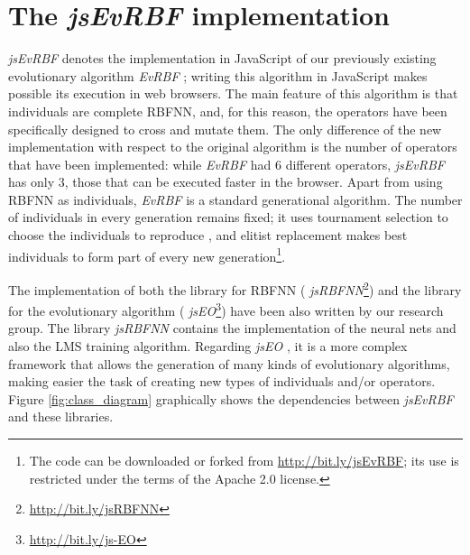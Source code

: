 \documentclass{article}
\begin{document}
\section{The {\em jsEvRBF} implementation} %
\label{sec:algorithm}
{\em jsEvRBF} denotes the implementation in JavaScript of our previously existing evolutionary algorithm {\em EvRBF} \cite{rivas03:EvRBF}; writing this algorithm in JavaScript makes possible its execution in web browsers.
The main feature of this algorithm is that individuals are complete RBFNN, and, for this reason,
the operators have been specifically designed to cross and mutate them. The only difference of the new implementation with respect to the original algorithm is the number of operators that have been implemented: while {\em EvRBF} had 6 different operators, {\em jsEvRBF} has only 3, those that can be executed faster in the browser. %
Apart from using RBFNN as individuals, {\em EvRBF} is a standard generational algorithm. The number of individuals in every generation remains fixed; it uses tournament selection to choose the individuals to reproduce , and elitist replacement  makes best individuals to form part of every new generation\footnote{The code can be downloaded or forked from
  \url{http://bit.ly/jsEvRBF}; its use is restricted under the terms
  of the Apache 2.0 license.}.

The implementation of both the library for RBFNN ({\em
  jsRBFNN}\footnote{\url{http://bit.ly/jsRBFNN}}) and the library for the evolutionary algorithm  ({\em
  jsEO}\footnote{\url{http://bit.ly/js-EO}}) have been also written by
our research group. The library {\em jsRBFNN} contains the implementation of the neural nets and also the LMS
training algorithm. %
Regarding  {\em jsEO} \cite{EvoStar2014:jsEO}, it is a more
complex framework that allows the generation of many kinds of
evolutionary algorithms, making easier the task of creating new types
of individuals and/or operators. Figure \ref{fig:class_diagram}
graphically shows the dependencies between {\em jsEvRBF} and these
libraries.
\end{document}
